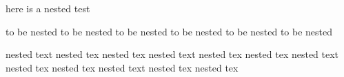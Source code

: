 here is a nested test
\begin{one}
  to be nested to be nested
  to be nested to be nested
  to be nested to be nested
  \begin{two}
    nested text nested tex nested tex
    nested text nested tex nested tex
    nested text nested tex nested tex
    nested text nested tex nested tex
    \end{two}
\end{one}
